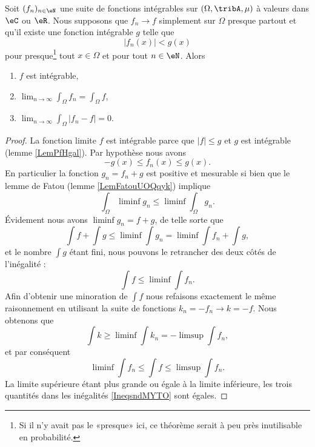 \begin{theorem}        \label{ThoConvDomLebVdhsTf}
    Soit \( (f_n)_{n\in\eN}\) une suite de fonctions intégrables sur \( (\Omega,\tribA,\mu)\) à valeurs dans \( \eC\) ou \( \eR\). Nous supposons que  \( f_n\to f\) simplement sur \( \Omega\) presque partout et qu'il existe une fonction intégrable \( g\) telle que
    \begin{equation}
        | f_n(x) |< g(x) 
    \end{equation}
    pour presque\footnote{Si il n'y avait pas le «presque» ici, ce théorème serait à peu près inutilisable en probabilité.} tout \( x\in\Omega\) et pour tout \( n\in \eN\). Alors
    \begin{enumerate}
        \item
            \( f\) est intégrable,
        \item
           $\lim_{n\to \infty} \int_{\Omega}f_n=\int_\Omega f$,
        \item
            $\lim_{n\to \infty} \int_{\Omega}| f_n-f |=0$.
    \end{enumerate}
\end{theorem}

\begin{proof}

    La fonction limite \( f\) est intégrable parce que \( | f |\leq g\) et \( g\) est intégrable (lemme \ref{LemPfHgal}). Par hypothèse nous avons
    \begin{equation}
        -g(x)\leq f_n(x)\leq g(x).
    \end{equation}
    En particulier la fonction \( g_n=f_n+g\) est positive et mesurable si bien que le lemme de Fatou (lemme \ref{LemFatouUOQqyk}) implique
    \begin{equation}
        \int_{\Omega}\liminf g_n\leq\liminf\int_{\Omega}g_n.
    \end{equation}
    Évidement nous avons \( \liminf g_n=f+g\), de telle sorte que
    \begin{equation}
        \int f+\int g\leq \liminf\int g_n=\liminf\int f_n+\int g,
    \end{equation}
    et le nombre \( \int g\) étant fini, nous pouvons le retrancher des deux côtés de l'inégalité :
    \begin{equation}
        \int f\leq\liminf\int f_n.
    \end{equation}
    Afin d'obtenir une minoration de \( \int f\) nous refaisons exactement le même raisonnement en utilisant la suite de fonctions \( k_n=-f_n\to k=-f\). Nous obtenons que
    \begin{equation}
        \int k\geq\liminf\int k_n=-\limsup\int f_n,
    \end{equation}
    et par conséquent
    \begin{equation}    \label{IneqsndMYTO}
        \liminf\int f_n\leq\int f\leq\limsup\int f_n.
    \end{equation}
    La limite supérieure étant plus grande ou égale à la limite inférieure, les trois quantités dans les inégalités \eqref{IneqsndMYTO} sont égales.
\end{proof}

